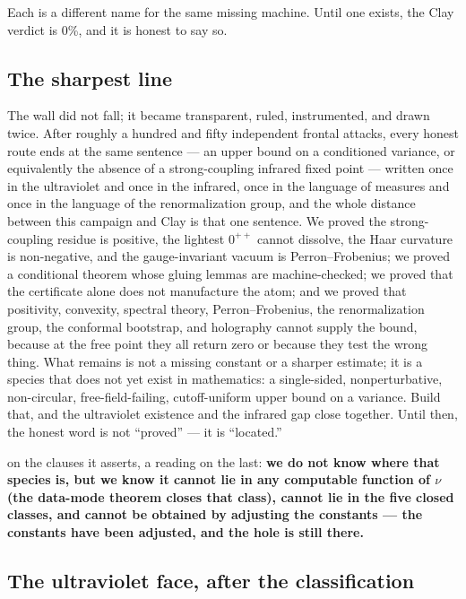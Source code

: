 Each is a different name for the same missing machine. Until one exists, the Clay verdict is 0\%,
and it is honest to say so.

\subsection{The sharpest line}

\begin{qbox}
The wall did not fall; it became transparent, ruled, instrumented, and drawn twice. After roughly
a hundred and fifty independent frontal attacks, every honest route ends at the same sentence ---
an upper bound on a conditioned variance, or equivalently the absence of a strong-coupling
infrared fixed point --- written once in the ultraviolet and once in the infrared, once in the
language of measures and once in the language of the renormalization group, and the whole
distance between this campaign and Clay is that one sentence. We proved the strong-coupling
residue is positive, the lightest $0^{++}$ cannot dissolve, the Haar curvature is non-negative,
and the gauge-invariant vacuum is Perron--Frobenius; we proved a conditional theorem whose gluing
lemmas are machine-checked; we proved that the certificate alone does not manufacture the atom;
and we proved that positivity, convexity, spectral theory, Perron--Frobenius, the renormalization
group, the conformal bootstrap, and holography cannot supply the bound, because at the free point
they all return zero or because they test the wrong thing. What remains is not a missing constant
or a sharper estimate; it is a species that does not yet exist in mathematics: a single-sided,
nonperturbative, non-circular, free-field-failing, cutoff-uniform upper bound on a variance.
Build that, and the ultraviolet existence and the infrared gap close together. Until then, the
honest word is not ``proved'' --- it is ``located.''
\end{qbox}

\LT{} on the clauses it asserts, a reading on the last: \textbf{we do not know where that species is,
but we know it cannot lie in any computable function of $\nu$ (the data-mode theorem closes that class),
cannot lie in the five closed classes, and cannot be obtained by adjusting the constants --- the
constants have been adjusted, and the hole is still there.}

\subsection{The ultraviolet face, after the classification}


